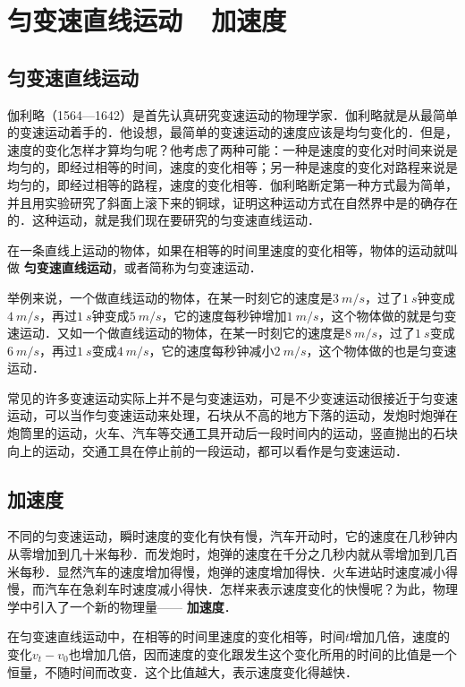 \section{匀变速直线运动~~加速度}

\subsection{匀变速直线运动}

伽利略（1564—1642）是首先认真研究变速运动的物理学家．伽利略就是从最简单的变速运动着手的．他设想，最简单的变速运动的速度应该是均匀变化的．但是，速度的变化怎样才算均匀呢？他考虑了两种可能：一种是速度的变化对时间来说是均匀的，即经过相等的时间，速度的变化相等；另一种是速度的变化对路程来说是均匀的，即经过相等的路程，速度的变化相等．伽利略断定第一种方式最为简单，并且用实验研究了斜面上滚下来的铜球，证明这种运动方式在自然界中是的确存在的．这种运动，就是我们现在要研究的匀变速直线运动．

在一条直线上运动的物体，如果在相等的时间里速度的变化相等，物体的运动就叫做\textbf{ 匀变速直线运动}，或者简称为匀变速运动．

举例来说，一个做直线运动的物体，在某一时刻它的速度是$\qty{3}{m/s}$，过了$\qty{1}{s}$钟变成$\qty{4}{m/s}$，再过$\qty{1}{s}$钟变成$\qty{5}{m/s}$，它的速度每秒钟增加$\qty{1}{m/s}$，这个物体做的就是匀变速运动．又如一个做直线运动的物体，在某一时刻它的速度是$\qty{8}{m/s}$，过了$\qty{1}{s}$变成$\qty{6}{m/s}$，再过$\qty{1}{s}$变成$\qty{4}{m/s}$，它的速度每秒钟减小$\qty{2}{m/s}$，这个物体做的也是匀变速运动．

常见的许多变速运动实际上并不是匀变速运劝，可是不少变速运动很接近于匀变速运动，可以当作匀变速运动来处理，石块从不高的地方下落的运动，发炮时炮弹在炮筒里的运动，火车、汽车等交通工具开动后一段时间内的运动，竖直抛出的石块向上的运动，交通工具在停止前的一段运动，都可以看作是匀变速运动．

\subsection{加速度}

不同的匀变速运动，瞬时速度的变化有快有慢，汽车开动时，它的速度在几秒钟内从零增加到几十米每秒．而发炮时，炮弹的速度在千分之几秒内就从零增加到几百米每秒．显然汽车的速度增加得慢，炮弹的速度增加得快．火车进站时速度减小得慢，而汽车在急刹车时速度减小得快．怎样来表示速度变化的快慢呢？为此，物理学中引入了一个新的物理量——\textbf{ 加速度}．

在匀变速直线运动中，在相等的时间里速度的变化相等，时间$t$增加几倍，速度的变化$v_t-v_0$也增加几倍，因而速度的变化跟发生这个变化所用的时间的比值是一个恒量，不随时间而改变．这个比值越大，表示速度变化得越快．

